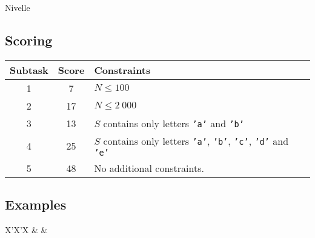 \begin{statement}[
  problempoints=110,
  timelimit=1 second,
  memorylimit=512 MiB,
]{Nivelle}
 \subsection*{Scoring}
{\renewcommand{\arraystretch}{1.4}
  \setlength{\tabcolsep}{6pt}
  \begin{tabular}{ccl}
 Subtask & Score & Constraints \\ \midrule
  1 & 7 & $N \le 100$ \\
  2 & 17 & $N \le 2\ 000$ \\
  3 & 13 & $S$ contains only letters \texttt{'a'} and \texttt{'b'} \\
  4 & 25 & $S$ contains only letters  \texttt{'a'}, \texttt{'b'},
               \texttt{'c'}, \texttt{'d'} and \texttt{'e'} \\
  5 & 48 & No additional constraints.
\end{tabular}}

\subsection*{Examples}
\begin{tabularx}{\textwidth}{X'X'X}
 &
 &
\end{tabularx}

\end{statement}

